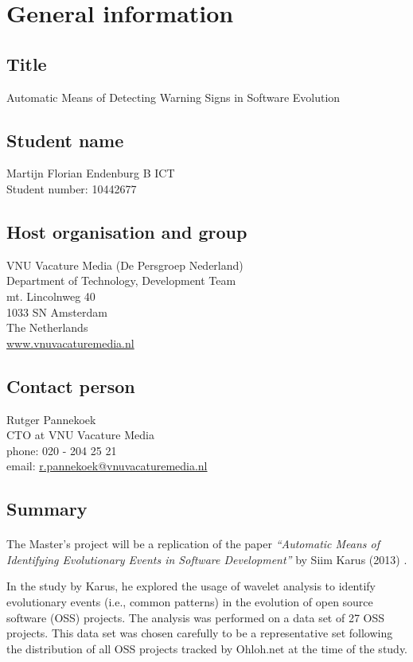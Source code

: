 \section{General information}
\subsection{Title}
Automatic Means of Detecting Warning Signs in Software Evolution

\subsection{Student name}
Martijn Florian Endenburg B ICT \\
Student number: 10442677

\subsection{Host organisation and group}
VNU Vacature Media (De Persgroep Nederland) \\
Department of Technology, Development Team \\
mt. Lincolnweg 40 \\
1033 SN Amsterdam \\
The Netherlands \\
\href{http://www.vnuvacaturemedia.nl}{www.vnuvacaturemedia.nl}

\subsection{Contact person}
Rutger Pannekoek \\
CTO at VNU Vacature Media \\
phone: 020 - 204 25 21 \\
email:
\href{mailto:r.pannekoek@vnuvacaturemedia.nl}{r.pannekoek@vnuvacaturemedia.nl}

\subsection{Summary}
\paragraph{}
The Master's project will be a replication of the paper \emph{``Automatic Means
of Identifying Evolutionary Events in Software Development''} by Siim Karus
(2013) \cite{karus2013}.

In the study by Karus, he explored the usage of wavelet analysis to identify
evolutionary events (i.e., common patterns) in the evolution of open source
software (OSS) projects. The analysis was performed on a data set of 27 OSS
projects. This data set was chosen carefully to be a representative set
following the distribution of all OSS projects tracked by Ohloh.net at the time
of the study.

